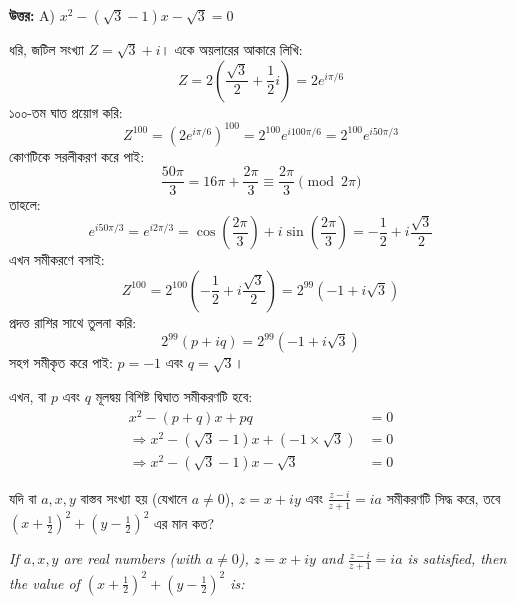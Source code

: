 \documentclass[12pt, a4paper]{article}
\begin{document}
\vspace{0.5em}
\begin{tcolorbox}[answerbox]
    \textbf{\color{success} উত্তর:} A) $x^2 - (\sqrt{3}-1)x - \sqrt{3} = 0$
\end{tcolorbox}
\vspace{1em}

\begin{tcolorbox}[solutionbox={সমাধান (Solution)}]
    \noindent
    ধরি, জটিল সংখ্যা $Z = \sqrt{3} + i$। একে অয়লারের আকারে লিখি:
    \[ Z = 2\left(\frac{\sqrt{3}}{2} + \frac{1}{2}i\right) = 2 e^{i\pi/6} \]
    ১০০-তম ঘাত প্রয়োগ করি:
    \[ Z^{100} = (2 e^{i\pi/6})^{100} = 2^{100} e^{i 100\pi/6} = 2^{100} e^{i 50\pi/3} \]
    কোণটিকে সরলীকরণ করে পাই:
    \[ \frac{50\pi}{3} = 16\pi + \frac{2\pi}{3} \equiv \frac{2\pi}{3} \pmod{2\pi} \]
    তাহলে:
    \[ e^{i 50\pi/3} = e^{i 2\pi/3} = \cos\left(\frac{2\pi}{3}\right) + i\sin\left(\frac{2\pi}{3}\right) = -\frac{1}{2} + i\frac{\sqrt{3}}{2} \]
    এখন সমীকরণে বসাই:
    \[ Z^{100} = 2^{100}\left(-\frac{1}{2} + i\frac{\sqrt{3}}{2}\right) = 2^{99}(-1 + i\sqrt{3}) \]
    প্রদত্ত রাশির সাথে তুলনা করি:
    \[ 2^{99}(p + iq) = 2^{99}(-1 + i\sqrt{3}) \]
    সহগ সমীকৃত করে পাই: $p = -1$ এবং $q = \sqrt{3}$। 
    
    এখন, বা $p$ এবং $q$ মূলদ্বয় বিশিষ্ট দ্বিঘাত সমীকরণটি হবে:
    \begin{align*}
        x^2 - (p + q)x + pq &= 0 \\
        \Rightarrow x^2 - (\sqrt{3} - 1)x + (-1 \times \sqrt{3}) &= 0 \\
        \Rightarrow x^2 - (\sqrt{3}-1)x - \sqrt{3} &= 0
    \end{align*}
\end{tcolorbox}
\begin{tcolorbox}[questionbox={প্রশ্ন (Question) 22}]
    \noindent
    যদি বা $a, x, y$ বাস্তব সংখ্যা হয় (যেখানে $a \neq 0$), $z = x + iy$ এবং $\frac{z-i}{z+1} = ia$ সমীকরণটি সিদ্ধ করে, তবে $\left(x + \frac{1}{2}\right)^2 + \left(y - \frac{1}{2}\right)^2$ এর মান কত?
    
    \vspace{0.8em}
    \begin{english}
    \noindent\textit{\color{darkgray}
    If $a, x, y$ are real numbers (with $a \neq 0$), $z = x + iy$ and $\frac{z-i}{z+1} = ia$ is satisfied, then the value of $\left(x + \frac{1}{2}\right)^2 + \left(y - \frac{1}{2}\right)^2$ is:
    }
    \end{english}
\end{tcolorbox}
\end{document}
